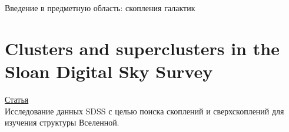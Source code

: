 \documentclass{article}
\begin{document}
\begin{center}{\huge Введение в предметную область: скопления галактик\\}\end{center}

\section{Clusters and superclusters in the Sloan Digital Sky Survey}
\hyperlink{https://www.aanda.org/articles/aa/pdf/2003/26/aah4162.pdf}{Статья}\\

Исследование данных SDSS с целью поиска скоплений и сверхскоплений для изучения структуры Вселенной.\\ 
\end{document}
